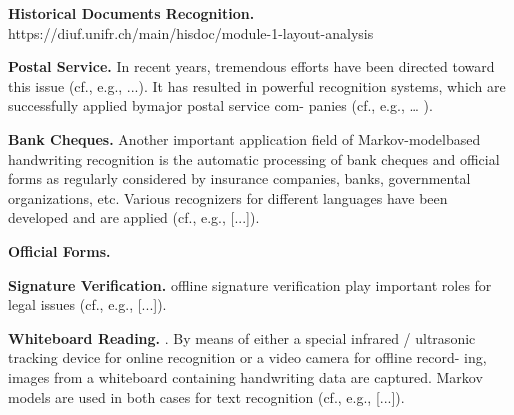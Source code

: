 \textbf{Historical Documents Recognition.} \cite{romero2012multimodal, frinken2013handwriting, edwards2007easily} https://diuf.unifr.ch/main/hisdoc/module-1-layout-analysis

\textbf{Postal Service.} In recent years, tremendous efforts have been directed toward this issue (cf., e.g., ...). It has resulted in powerful recognition systems, which are successfully applied bymajor postal service com- panies (cf., e.g., … ). \cite{plotz2009markov}

\textbf{Bank Cheques.} Another important application field of Markov-modelbased handwriting recognition is the automatic processing of bank cheques and official forms as regularly considered by insurance companies, banks, governmental organizations, etc. Various recognizers for different languages have been developed and are applied (cf., e.g., [...]). \cite{plotz2009markov}

\textbf{Official Forms.}

\textbf{Signature Verification.} offline signature verification play important roles for legal issues (cf., e.g., [...]). \cite{plotz2009markov}

\textbf{Whiteboard Reading.} \cite{wienecke2005toward}. By means of either a special infrared / ultrasonic tracking device for online recognition or a video camera for offline record- ing, images from a whiteboard containing handwriting data are captured. Markov models are used in both cases for text recognition (cf., e.g., [...]). \cite{plotz2009markov}
